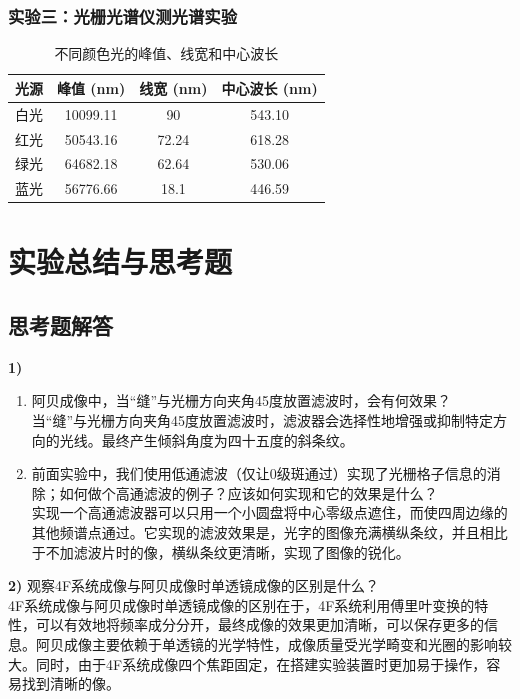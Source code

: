 \documentclass[zihao=5, UTF8]{article}
\theoremstyle{MyLineTheoremStyle} %
\theoremstyle{MyBlockTheoremStyle} %
\theoremstyle{MySubsubsectionStyle} %
\begin{document}
\subsubsection{实验三：光栅光谱仪测光谱实验}

\begin{table}[ht]
    \centering
    \begin{tabular}{|c|c|c|c|}
        \hline
        光源 & 峰值 (nm) & 线宽 (nm) & 中心波长 (nm) \\
        \hline
        白光 & 10099.11 & 90 & 543.10 \\
        红光 & 50543.16 & 72.24 & 618.28 \\
        绿光 & 64682.18 & 62.64 & 530.06 \\
        蓝光 & 56776.66 & 18.1 & 446.59 \\
        \hline
    \end{tabular}
    \caption{不同颜色光的峰值、线宽和中心波长}
    \label{tab:光源参数}
\end{table}

\section{实验总结与思考题}

\subsection{思考题解答}

\textbf{1)} 
\begin{enumerate}
    \item[a)] 阿贝成像中，当“缝”与光栅方向夹角45度放置滤波时，会有何效果？\\
    当“缝”与光栅方向夹角45度放置滤波时，滤波器会选择性地增强或抑制特定方向的光线。最终产生倾斜角度为四十五度的斜条纹。

    \item[b)] 前面实验中，我们使用低通滤波（仅让0级斑通过）实现了光栅格子信息的消除；如何做个高通滤波的例子？应该如何实现和它的效果是什么？\\
    实现一个高通滤波器可以只用一个小圆盘将中心零级点遮住，而使四周边缘的其他频谱点通过。它实现的滤波效果是，光字的图像充满横纵条纹，并且相比于不加滤波片时的像，横纵条纹更清晰，实现了图像的锐化。
\end{enumerate}

\textbf{2)} 观察4F系统成像与阿贝成像时单透镜成像的区别是什么？\\
\indent 4F系统成像与阿贝成像时单透镜成像的区别在于，4F系统利用傅里叶变换的特性，可以有效地将频率成分分开，最终成像的效果更加清晰，可以保存更多的信息。阿贝成像主要依赖于单透镜的光学特性，成像质量受光学畸变和光圈的影响较大。同时，由于4F系统成像四个焦距固定，在搭建实验装置时更加易于操作，容易找到清晰的像。
\end{document}
